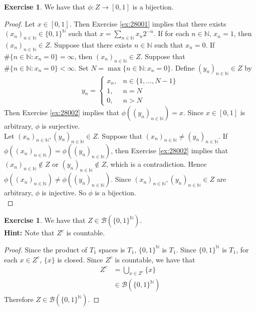 \documentclass{book}
\theoremstyle{definition}
\newtheorem{ex}[definition]{Exercise}
\newcommand{\N}{\mathbb{N}}
\newcommand{\MB}{\mathcal{B}}
\newcommand{\lex}[1]{\label{ex:#1}}
\newcommand{\rex}[1]{Exercise \ref{ex:#1}}
\DeclareMathOperator*{\0}{\mbf{0}}
\DeclareMathOperator*{\1}{\mbf{1}}
\begin{document}
	\begin{ex}
		We have that $\phi:Z \rightarrow [0,1]$ is a bijection.
	\end{ex}

	\begin{proof}
		Let $x \in [0,1]$. Then \rex{28001} implies that there exists $(x_n)_{n \in \N} \in \{0,1\}^{\N}$ such that $x = \sum\limits_{n \in \N} x_n2^{-n}$. If for each $n \in \N$, $x_n = 1$, then $(x_n)_{n \in \N} \in Z$. Suppose that there exists $n \in \N$ such that $x_n = 0$. If $\# \{n \in \N: x_n = 0\} = \infty$, then $(x_n)_{n \in \N} \in Z$. Suppose that $ \# \{n \in \N: x_n = 0\} < \infty$. Set $N = \max \{ n \in \N: x_n = 0\}$. Define $(y_n)_{n \in \N} \in Z$ by 
		\[
		y_n = 
		\begin{cases}
			x_n, & n \in \{1, \ldots, N-1\} \\
			1, & n = N \\
			0, & n > N
		\end{cases}
		\]
		Then \rex{28002} implies that $\phi((y_n)_{n \in \N}) = x$. Since $x \in [0,1]$ is arbitrary, $\phi$ is surjective. \vspace{.2cm}\\  Let $(x_n)_{n \in \N}, (y_n)_{n \in \N} \in Z$. Suppose that $(x_n)_{n \in \N} \neq (y_n)_{n \in \N}$. If  $\phi((x_n)_{n \in \N}) = \phi((y_n)_{n \in \N})$, then \rex{28002} implies that $(x_n)_{n \in \N} \not \in Z$ or $(y_n)_{n \in \N} \not \in Z$, which is a contradiction. Hence $\phi((x_n)_{n \in \N}) \neq \phi((y_n)_{n \in \N})$. Since $(x_n)_{n \in \N}, (y_n)_{n \in \N} \in Z$ are arbitrary, $\phi$ is injective. So $\phi$ is a bijection. \\
	\end{proof}

	\begin{ex} \lex{28003} 
		We have that $Z \in \MB(\{0,1\}^{\N})$. \\
		\textbf{Hint:} Note that $Z^c$ is countable. 
	\end{ex}

	\begin{proof}
		Since the product of $T_1$ spaces is $T_1$, $\{0,1\}^{\N}$ is $T_1$. Since $\{0,1\}^{\N}$ is $T_1$, for each $x \in Z^c$, $\{x \}$ is closed. Since $Z^c$ is countable, we have that 
		\begin{align*}
			Z^c
			& = \bigcup_{x \in  Z^c} \{x\} \\
			& \in  \MB(\{0,1\}^{\N})
		\end{align*} 
		Therefore $Z \in  \MB(\{0,1\}^{\N})$.
	\end{proof}
\end{document}
